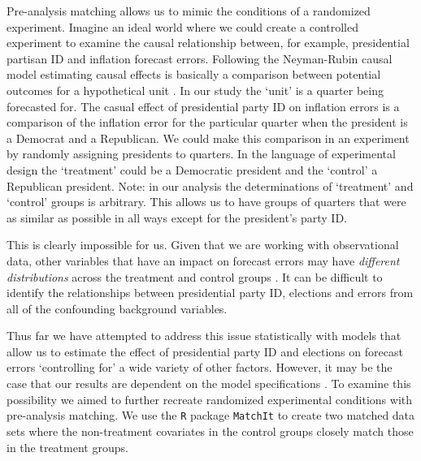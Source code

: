 \documentclass[a4paper]{article}
\begin{document}
Pre-analysis matching allows us to mimic the conditions of a randomized experiment. Imagine an ideal world where we could create a controlled experiment to examine the causal relationship between, for example, presidential partisan ID and inflation forecast errors. Following the Neyman-Rubin causal model \citep{Sekhon2008} estimating causal effects is basically a comparison between potential outcomes for a hypothetical unit \citep{Stuart2010}. In our study the `unit' is a quarter being forecasted for. The casual effect of presidential party ID on inflation errors is a comparison of the inflation error for the particular quarter when the president is a Democrat and a Republican. We could make this comparison in an experiment by randomly assigning presidents to quarters. In the language of experimental design the `treatment' could be a Democratic president and the `control' a Republican president. Note: in our analysis the determinations of `treatment' and `control' groups is arbitrary. This allows us to have groups of quarters that were as similar as possible in all ways except for the president's party ID. 

This is clearly impossible for us. Given that we are working with observational data, other variables that have an impact on forecast errors may have {\emph{different distributions}} across the treatment and control groups \citep{Cochran1973, Diamond2012}. It can be difficult to identify the relationships between presidential party ID, elections and errors from all of the confounding background variables.

Thus far we have attempted to address this issue statistically with models that allow us to estimate the effect of presidential party ID and elections on forecast errors `controlling for' a wide variety of other factors. However, it may be the case that our results are dependent on the model specifications \citep{Ho2007}. To examine this possibility we aimed to further recreate randomized experimental conditions with pre-analysis matching. We use the {\tt{R}} package {\tt{MatchIt}} \citep{matchit2011} to create two matched data sets where the non-treatment covariates in the control groups closely match those in the treatment groups.
\end{document}
